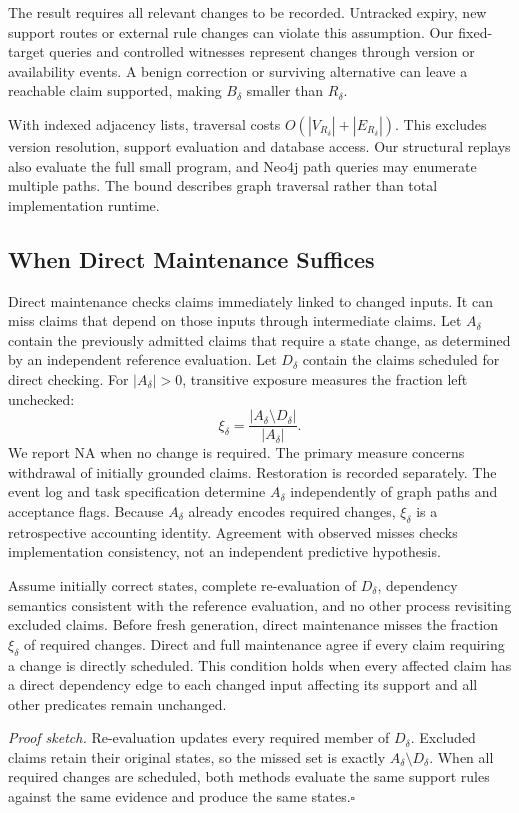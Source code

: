 \documentclass[runningheads]{llncs}
\begin{document}
The result requires all relevant changes to be recorded. Untracked expiry,
new support routes or external rule changes can violate this assumption.
Our fixed-target queries and controlled witnesses represent changes through
version or availability events. A benign correction or surviving alternative
can leave a reachable claim supported, making $B_\delta$ smaller than $R_\delta$.

With indexed adjacency lists, traversal costs
$O(|V_{R_\delta}|+|E_{R_\delta}|)$. This excludes version resolution, support
evaluation and database access. Our structural replays also evaluate the full
small program, and Neo4j path queries may enumerate multiple paths.
The bound describes graph traversal rather than total implementation runtime.





\subsection{When Direct Maintenance Suffices}

Direct maintenance checks claims immediately linked to changed inputs.
It can miss claims that depend on those inputs through intermediate claims.
Let $A_\delta$ contain the previously admitted claims that require a state
change, as determined by an independent reference evaluation. Let $D_\delta$
contain the claims scheduled for direct checking. For $|A_\delta|>0$,
transitive exposure measures the fraction left unchecked:
\begin{equation}
 \xi_\delta=\frac{|A_\delta\setminus D_\delta|}{|A_\delta|}.
 \label{eq:exposure}
\end{equation}
We report NA when no change is required. The primary measure concerns
withdrawal of initially grounded claims. Restoration is recorded separately.
The event log and task specification determine $A_\delta$ independently
of graph paths and acceptance flags. Because $A_\delta$ already encodes
required changes, $\xi_\delta$ is a retrospective accounting identity.
Agreement with observed misses checks implementation consistency, not an
independent predictive hypothesis.

\begin{proposition}
Assume initially correct states, complete re-evaluation of $D_\delta$,
dependency semantics consistent with the reference evaluation, and no other
process revisiting excluded claims. Before fresh generation, direct maintenance
misses the fraction $\xi_\delta$ of required changes. Direct and full maintenance
agree if every claim requiring a change is directly scheduled. This condition
holds when every affected claim has a direct dependency edge to each changed
input affecting its support and all other predicates remain unchanged.
\end{proposition}
\noindent\emph{Proof sketch.}
Re-evaluation updates every required member of $D_\delta$. Excluded claims
retain their original states, so the missed set is exactly
$A_\delta\setminus D_\delta$. When all required changes are scheduled, both
methods evaluate the same support rules against the same evidence and
produce the same states.\hfill$\square$
\end{document}
